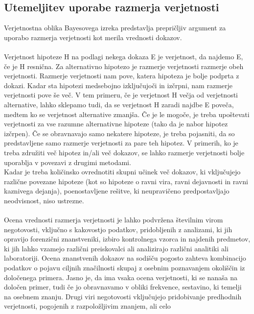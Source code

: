 \documentclass[12pt,a4paper]{amsart}
\theoremstyle{definition} %
\theoremstyle{plain} %
\begin{document}
\subsection{Utemeljitev uporabe razmerja verjetnosti}
Verjetnostna oblika Bayesovega izreka predstavlja prepričljiv argument za uporabo razmerja verjetnosti kot merila vrednosti dokazov.\\\\
Verjetnost hipoteze H na podlagi nekega dokaza E je verjetnost, da najdemo E, če je H resnična. Za alternativno hipotezo je razmerje verjetnosti razmerje obeh
verjetnosti. Razmerje verjetnosti nam pove, katera hipoteza je bolje podprta z dokazi. Kadar sta hipotezi medsebojno izključujoči in izčrpni, nam razmerje verjetnosti pove še več.
V tem primeru, če je verjetnost H večja od verjetnosti alternative, lahko sklepamo tudi, da se verjetnost H zaradi najdbe E poveča, medtem ko se
verjetnost alternative zmanjša. Če je le mogoče, je treba upoštevati verjetnosti za vse razumne alternativne hipoteze (tako da je nabor hipotez
izčrpen). Če se obravnavajo samo nekatere hipoteze, je treba pojasniti, da so predstavljene samo razmerje verjetnosti za pare teh hipotez. V primerih, ko je treba
združiti več hipotez in/ali več dokazov, se lahko razmerje verjetnosti bolje uporablja v povezavi z drugimi metodami.\\
Kadar je treba količinsko ovrednotiti skupni učinek več dokazov, ki vključujejo različne povezane hipoteze (kot so hipoteze o ravni vira, ravni
dejavnosti in ravni kaznivega dejanja), poenostavljene rešitve, ki neupravičeno predpostavljajo neodvisnost, niso ustrezne.\\\\
Ocena vrednosti razmerja verjetnosti je lahko podvržena številnim virom negotovosti, vključno s kakovostjo podatkov, pridobljenih z analizami, ki jih
opravijo forenzični znanstveniki, izbiro kontrolnega vzorca in najdenih predmetov, ki jih lahko vzamejo različni preiskovalci ali analizirajo različni
analitiki ali laboratoriji. Ocena znanstvenih dokazov na sodišču pogosto zahteva kombinacijo podatkov o pojavu ciljnih značilnosti skupaj z osebnim poznavanjem
okoliščin iz določenega primera. Jasno je, da ima vsaka ocena verjetnosti, ki se nanaša na določen primer, tudi če jo obravnavamo v obliki frekvence, sestavino,
ki temelji na osebnem znanju. Drugi viri negotovosti vključujejo pridobivanje predhodnih verjetnosti, pogojenih z razpoložljivim znanjem, ali celo
\end{document}
